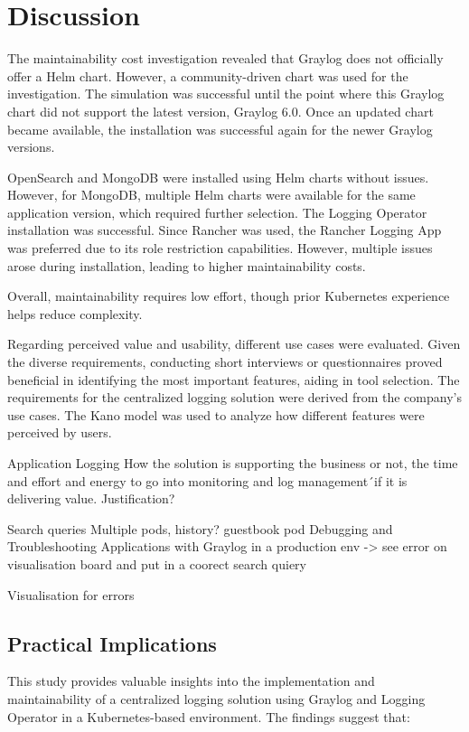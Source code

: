 \documentclass[../main.tex]{subfiles}
\begin{document}
\chapter{Discussion}

The maintainability cost investigation revealed that Graylog does not officially offer a Helm chart. However, a community-driven chart was used for the investigation. The simulation was successful until the point where this Graylog chart did not support the latest version, Graylog 6.0. Once an updated chart became available, the installation was successful again for the newer Graylog versions.

OpenSearch and MongoDB were installed using Helm charts without issues. However, for MongoDB, multiple Helm charts were available for the same application version, which required further selection. The Logging Operator installation was successful. Since Rancher was used, the Rancher Logging App was preferred due to its role restriction capabilities. However, multiple issues arose during installation, leading to higher maintainability costs.

Overall, maintainability requires low effort, though prior Kubernetes experience helps reduce complexity. 

Regarding perceived value and usability, different use cases were evaluated. Given the diverse requirements, conducting short interviews or questionnaires proved beneficial in identifying the most important features, aiding in tool selection. The requirements for the centralized logging solution were derived from the company's use cases. The Kano model was used to analyze how different features were perceived by users.

Application Logging
How the solution is supporting the business or not, the time and effort and energy to go into monitoring and log management´if it is delivering value. Justification?

Search queries
Multiple pods, history? guestbook pod
Debugging and Troubleshooting Applications with Graylog in a production env -> see error on visualisation board and put in a coorect search quiery

Visualisation for errors

\section{Practical Implications}

This study provides valuable insights into the implementation and maintainability of a centralized logging solution using Graylog and Logging Operator in a Kubernetes-based environment. The findings suggest that:
  
\end{document}
